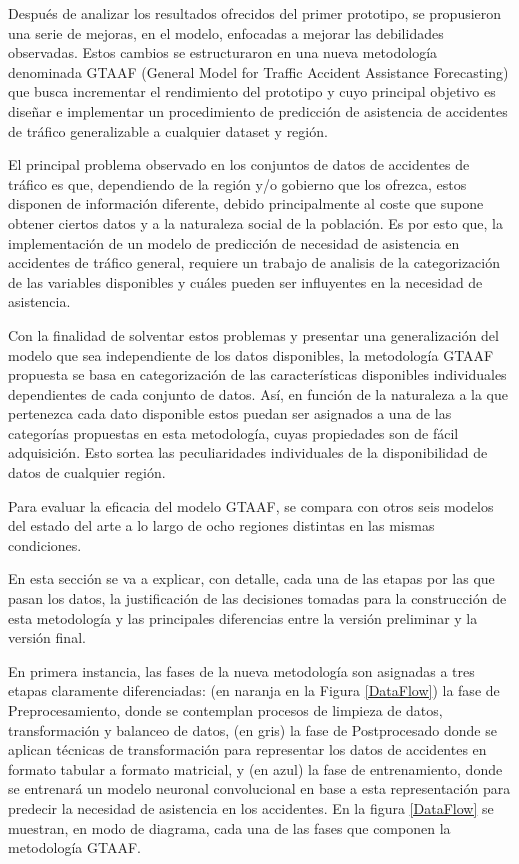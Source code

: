 \documentclass{uathesis-es}
\begin{document}
Después de analizar los resultados ofrecidos del primer prototipo, se propusieron una serie de mejoras, en el modelo, enfocadas a mejorar las debilidades observadas. Estos cambios se estructuraron en una nueva metodología denominada GTAAF (General Model for Traffic Accident Assistance Forecasting) que busca incrementar el rendimiento del prototipo y cuyo principal objetivo es diseñar e implementar un procedimiento de predicción de asistencia de accidentes de tráfico generalizable a cualquier dataset y región. 

El principal problema observado en los conjuntos de datos de accidentes de tráfico es que, dependiendo de la región y/o gobierno que los ofrezca, estos disponen de información diferente, debido principalmente al coste que supone obtener ciertos datos y a la naturaleza social de la población. Es por esto que, la implementación de un modelo de predicción de necesidad de asistencia en accidentes de tráfico general, requiere un trabajo de analisis de la categorización de las variables disponibles y cuáles pueden ser influyentes en la necesidad de asistencia.

Con la finalidad de solventar estos problemas y presentar una generalización del modelo que sea independiente de los datos disponibles, la metodología GTAAF propuesta se basa en categorización de las características disponibles individuales dependientes de cada conjunto de datos. Así, en función de la naturaleza a la que pertenezca cada dato disponible estos puedan ser asignados a una de las categorías propuestas en esta metodología, cuyas propiedades son de fácil adquisición. Esto sortea las peculiaridades individuales de la disponibilidad de datos de cualquier región. 

Para evaluar la eficacia del modelo GTAAF, se compara con otros seis modelos del estado del arte a lo largo de ocho regiones distintas en las mismas condiciones.

En esta sección se va a explicar, con detalle, cada una de las etapas por las que pasan los datos, la justificación de las decisiones tomadas para la construcción de esta metodología y las principales diferencias entre la versión preliminar y la versión final.

En primera instancia, las fases de la nueva metodología son asignadas a tres etapas claramente diferenciadas: (en naranja en la Figura \ref{DataFlow}) la fase de Preprocesamiento, donde se contemplan procesos de limpieza de datos, transformación y balanceo de datos, (en gris) la fase de Postprocesado donde se aplican técnicas de transformación para representar los datos de accidentes en formato tabular a formato matricial, y (en azul) la fase de entrenamiento, donde se entrenará un modelo neuronal convolucional en base a esta representación para predecir la necesidad de asistencia en los accidentes. En la figura \ref{DataFlow} se muestran, en modo de diagrama, cada una de las fases que componen la metodología GTAAF.
\end{document}
